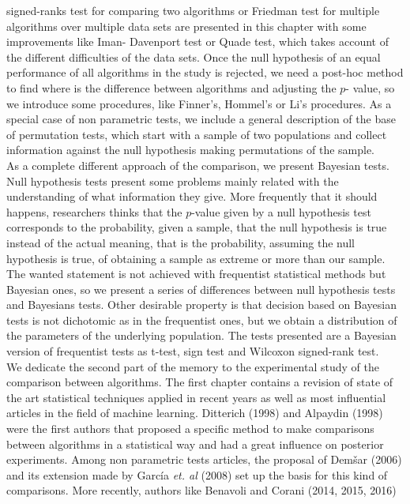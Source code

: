 signed-ranks test for comparing two algorithms or Friedman 
test for multiple algorithms over multiple data sets are 
presented in this chapter with some improvements like Iman-
Davenport test or Quade test, which takes account of the 
different difficulties of the data sets. Once the null 
hypothesis of an equal performance of all algorithms in the 
study is rejected, we need a post-hoc method to find where is 
the difference between algorithms and adjusting the $p$-
value, so we introduce some procedures, like Finner’s, 
Hommel’s or Li’s procedures. As a special case of non 
parametric tests, we include a general description of the 
base of permutation tests, which start with a sample of two 
populations and collect information against the null 
hypothesis making permutations of the sample. \\
	As a complete different approach of the comparison, we 
present Bayesian tests. Null hypothesis tests present some 
problems mainly related with the understanding of what 
information they give. More frequently that it should 
happens, researchers thinks that the $p$-value given by a 
null hypothesis test corresponds to the probability, given a 
sample, that the null hypothesis is true instead of the 
actual meaning, that is the probability, assuming the null 
hypothesis is true, of obtaining a sample as extreme or more 
than our sample. The wanted statement is not achieved with 
frequentist statistical methods but Bayesian ones, so we 
present a series of differences between null hypothesis tests 
and Bayesians tests. Other desirable property is that 
decision based on Bayesian tests is not dichotomic as in the 
frequentist ones, but we obtain a distribution of the 
parameters of the underlying population. The tests presented 
are a Bayesian version of frequentist tests as t-test, sign 
test and Wilcoxon signed-rank test.\\
	We dedicate the second part of the memory to the 
experimental study of the comparison between algorithms. 
The first chapter contains a revision of state of the art 
statistical techniques applied in recent years as well as 
most influential articles in the field of machine learning.  
Ditterich (1998) and  Alpaydin (1998) were the first authors that proposed 
a specific method to make comparisons between algorithms in a 
statistical way and had a great influence on posterior 
experiments. Among non parametric tests articles, the 
proposal of Dem\v{s}ar (2006) and its extension made by García 
\textit{et. al} (2008) set up the basis for this kind of 
comparisons. More recently, authors like Benavoli and Corani (2014, 2015, 2016)
